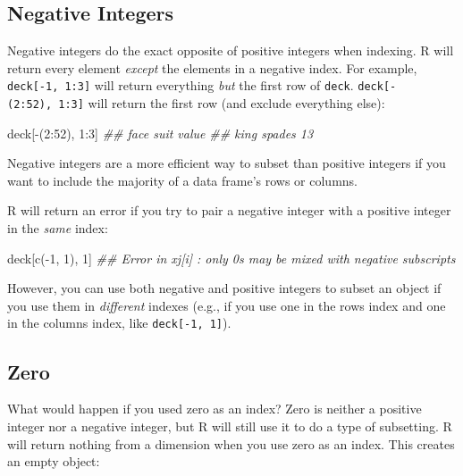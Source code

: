 \documentclass[
  letterpaper,
  DIV=11,
  numbers=noendperiod]{scrbook}
\newenvironment{Shaded}{\begin{snugshade}}{\end{snugshade}}
\newcommand{\DecValTok}[1]{\textcolor[rgb]{0.68,0.00,0.00}{#1}}
\newcommand{\DocumentationTok}[1]{\textcolor[rgb]{0.37,0.37,0.37}{\textit{#1}}}
\newcommand{\FunctionTok}[1]{\textcolor[rgb]{0.28,0.35,0.67}{#1}}
\newcommand{\NormalTok}[1]{\textcolor[rgb]{0.00,0.23,0.31}{#1}}
\newcommand{\SpecialCharTok}[1]{\textcolor[rgb]{0.37,0.37,0.37}{#1}}
\begin{document}
\subsection{Negative Integers}\label{negative-integers}

Negative integers do the exact opposite of positive integers when
indexing. R will return every element \emph{except} the elements in a
negative index. For example, \texttt{deck{[}-1,\ 1:3{]}} will return
everything \emph{but} the first row of \texttt{deck}.
\texttt{deck{[}-(2:52),\ 1:3{]}} will return the first row (and exclude
everything else):

\begin{Shaded}
\begin{Highlighting}[]
\NormalTok{deck[}\SpecialCharTok{{-}}\NormalTok{(}\DecValTok{2}\SpecialCharTok{:}\DecValTok{52}\NormalTok{), }\DecValTok{1}\SpecialCharTok{:}\DecValTok{3}\NormalTok{]}
\DocumentationTok{\#\# face   suit value}
\DocumentationTok{\#\# king spades    13}
\end{Highlighting}
\end{Shaded}

Negative integers are a more efficient way to subset than positive
integers if you want to include the majority of a data frame's rows or
columns.

R will return an error if you try to pair a negative integer with a
positive integer in the \emph{same} index:

\begin{Shaded}
\begin{Highlighting}[]
\NormalTok{deck[}\FunctionTok{c}\NormalTok{(}\SpecialCharTok{{-}}\DecValTok{1}\NormalTok{, }\DecValTok{1}\NormalTok{), }\DecValTok{1}\NormalTok{]}
\DocumentationTok{\#\# Error in xj[i] : only 0\textquotesingle{}s may be mixed with negative subscripts}
\end{Highlighting}
\end{Shaded}

However, you can use both negative and positive integers to subset an
object if you use them in \emph{different} indexes (e.g., if you use one
in the rows index and one in the columns index, like
\texttt{deck{[}-1,\ 1{]}}).

\subsection{Zero}\label{zero}

What would happen if you used zero as an index? Zero is neither a
positive integer nor a negative integer, but R will still use it to do a
type of subsetting. R will return nothing from a dimension when you use
zero as an index. This creates an empty object:
\end{document}
